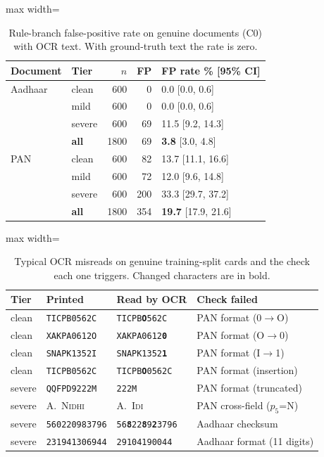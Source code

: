 \documentclass[12pt]{article}
\begin{document}
\begin{table}[H]
\caption{Rule-branch false-positive rate on genuine documents (C0)
with OCR text. With ground-truth text the rate is zero.}
\label{tab:fpr}
\centering
\footnotesize
\setlength{\tabcolsep}{5pt}
\renewcommand{\arraystretch}{1.08}
\begin{adjustbox}{max width=\linewidth}
\begin{tabular}{@{}llrrl@{}}
\toprule
Document & Tier & $n$ & FP & FP rate \% [95\% CI] \\
\midrule
Aadhaar & clean & 600 & 0 & 0.0 [0.0, 0.6] \\
 & mild & 600 & 0 & 0.0 [0.0, 0.6] \\
 & severe & 600 & 69 & 11.5 [9.2, 14.3] \\
 & \textbf{all} & 1800 & 69 & \textbf{3.8} [3.0, 4.8] \\
\addlinespace[4pt]
PAN & clean & 600 & 82 & 13.7 [11.1, 16.6] \\
 & mild & 600 & 72 & 12.0 [9.6, 14.8] \\
 & severe & 600 & 200 & 33.3 [29.7, 37.2] \\
 & \textbf{all} & 1800 & 354 & \textbf{19.7} [17.9, 21.6] \\
\bottomrule
\end{tabular}
\end{adjustbox}
\end{table}
\clearpage
\begin{table}[H]
\caption{Typical OCR misreads on genuine training-split cards and the
check each one triggers. Changed characters are in bold.}
\label{tab:misreads}
\centering
\scriptsize
\setlength{\tabcolsep}{3pt}
\renewcommand{\arraystretch}{1.1}
\begin{adjustbox}{max width=\linewidth}
\begin{tabular}{@{}l l l l@{}}
\toprule
Tier & Printed & Read by OCR & Check failed \\
\midrule
clean  & \texttt{TICPB0562C}   & \texttt{TICPB\textbf{O}562C}  & PAN format (0$\to$O) \\
clean  & \texttt{XAKPA0612O}   & \texttt{XAKPA0612\textbf{0}}  & PAN format (O$\to$0) \\
clean  & \texttt{SNAPK1352I}   & \texttt{SNAPK1352\textbf{1}}  & PAN format (I$\to$1) \\
clean  & \texttt{TICPB0562C}   & \texttt{TICPB\textbf{O}0562C} & PAN format (insertion) \\
severe & \texttt{QQFPD9222M}   & \texttt{222M}                 & PAN format (truncated) \\
severe & \textsc{A.\ Nidhi}    & \textsc{A.\ Idi}              & PAN cross-field ($p_5$=N) \\
severe & \texttt{560220983796} & \texttt{56\textbf{8}22\textbf{8}9\textbf{2}3796} & Aadhaar checksum \\
severe & \texttt{231941306944} & \texttt{29104190044}          & Aadhaar format (11 digits) \\
\bottomrule
\end{tabular}
\end{adjustbox}
\end{table}
\end{document}

